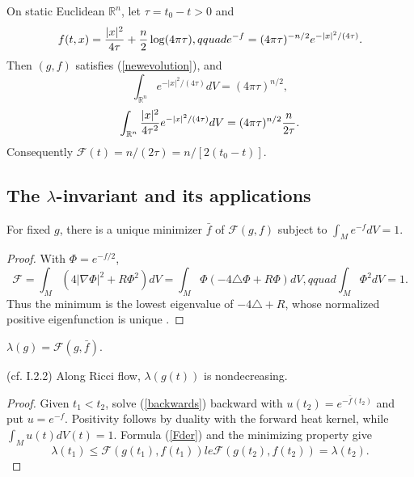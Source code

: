 On static Euclidean $\mathbb R^n$, let $\tau=t_0-t>0$ and
\begin{equation}
f(t,x)={|x|^2\over4\tau}+{n\over2}\log(4\pi\tau),qquad
e^{-f}=(4\pi\tau)^{-n/2}e^{-|x|^2/(4\tau)}.
\end{equation}
Then $(g,f)$ satisfies (\ref{newevolution}), and
\begin{equation}\label{Gaussianintegral}
\int_{\mathbb R^n}e^{-|x|^2/(4\tau)}dV=(4\pi\tau)^{n/2},
\end{equation}
\begin{equation}\label{Gaussianintegral2}
\int_{\mathbb R^n}{|x|^2\over4\tau^2}e^{-|x|^2/(4\tau)}dV
=(4\pi\tau)^{n/2}{n\over2\tau}.
\end{equation}
Consequently ${\mathcal F}(t)=n/(2\tau)=n/[2(t_0-t)]$.

\subsection{The $\lambda$-invariant and its applications}
\label{I.2.2}

\begin{proposition}
  \label{prop:kl-invariant-its-applications-uniqueness-f-entropy}
For fixed $g$, there is a unique minimizer $\bar f$ of ${\mathcal F}(g,f)$
subject to $\int_Me^{-f}dV=1$.
\end{proposition}
\begin{proof}
\sketch
With $\Phi=e^{-f/2}$,
\begin{equation}
{\mathcal F}=\int_M(4|\nabla\Phi|^2+R\Phi^2)dV
=\int_M\Phi(-4\triangle\Phi+R\Phi)dV,qquad\int_M\Phi^2dV=1.
\end{equation}
Thus the minimum is the lowest eigenvalue of $-4\triangle+R$, whose normalized
positive eigenfunction is unique \cite[Chapter XIII.12]{Reed-Simon}.
\end{proof}

\begin{definition}
  \label{def:kl-invariant-its-applications-lambda-invariant}
$\lambda(g)={\mathcal F}(g,\bar f)$.
\end{definition}

\begin{proposition}
  \label{prop:kl-invariant-its-applications-monotonicity-entropy}
  (cf. I.2.2) \label{mono}
Along Ricci flow, $\lambda(g(t))$ is nondecreasing.
\end{proposition}
\begin{proof}
\sketch
Given $t_1<t_2$, solve (\ref{backwards}) backward with
$u(t_2)=e^{-\bar f(t_2)}$ and put $u=e^{-f}$. Positivity follows by duality
with the forward heat kernel, while $\int_Mu(t)dV(t)=1$. Formula (\ref{Fder})
and the minimizing property give
\[\lambda(t_1)\le {\mathcal F}(g(t_1),f(t_1))le {\mathcal F}(g(t_2),f(t_2))=\lambda(t_2).\]
\end{proof}

